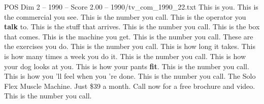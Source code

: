 \begin{textsample}{POS Dim 2 – 1990 – Score 2.00 – 1990/tv\_com\_1990\_22.txt}  \label{ex:f2_pos_032}
This is you.
This is the commercial you see.
This is the number you call.
This is the operator you \textbf{talk} to.
This is the stuff that arrives.
This is the number you call.
This is the box that comes.
This is the machine you get.
This is the number you call.
These are the exercises you do.
This is the number you call.
This is how long it takes.
This is how many times a week you do it.
This is the number you call.
This is how your dog looks at you.
This is how your pants \textbf{fit}.
This is the number you call.
This is how you 'll feel when you 're done.
This is the number you call.
The Solo Flex Muscle Machine.
Just \$39 a month.
Call now for a free brochure and video.
This is the number you call.

\end{textsample}
